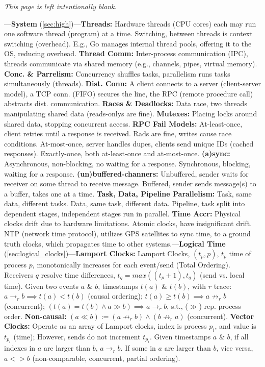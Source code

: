


\thispagestyle{empty}
\mbox{}
\vfill
\begin{center}
    \textit{This page is left intentionally blank.}
\end{center}
\vfill
\newpage
\noindent


\begin{multicols}{2}

\noindent
---\textbf{System} (\ref{sec:high})---\textbf{Threads:} Hardware threads (CPU cores) each
may run one software thread (program) at a time. Switching,
between threads is context switching (overhead). E.g.,
Go manages internal thread pools, offering it to the OS,
reducing overhead.
\textbf{Thread Comm:} Inter-process communication (IPC), 
threads communicate via shared memory (e.g., channels, pipes, virtual memory).
\textbf{Conc. \& Parrelism:} Concurrency shuffles tasks,
parallelism runs tasks simultaneously (threads).
\textbf{Dist. Conn:} A client connects to a server (client-server model), a TCP conn. (FIFO)
secures the line, the RPC (remote procedure call) abstracts
dist. communication.
\textbf{Races \& Deadlocks:} Data race, two threads manipulating shared data (reads-onlys are fine).
\textbf{Mutexes:} Placing locks around shared data, stopping concurrent access.
\textbf{RPC Fail Models:} At-least-once, client retries until a response is received.
Rads are fine, writes cause race conditions. At-most-once, server handles dupes, clients
send unique IDs (cached responses). Exactly-once, both at-least-once and at-most-once.
\textbf{(a)sync:} Asynchronous, non-blocking, no waiting for a response. Synchronous, blocking, waiting for a response.
\textbf{(un)buffered-channers:} Unbuffered, sender waits for receiver on some thread to receive message. Buffered, sender sends message(s) to a buffer, takes one at a time.
\textbf{Task, Data, Pipeline Parallelism:} Task, same data, different tasks. Data, same task, different data. Pipeline, task split into dependent stages, independent stages run in parallel.
\textbf{Time Accr:} Physical clocks drift due to hardware limitations. Atomic clocks, have insignificant drift. NTP (network time protocol), 
utilizes GPS satellites to sync time, to a ground truth clocks, which propagates time to other systems.---\textbf{Logical Time} (\ref{sec:logical_clocks})---\textbf{Lamport Clocks:} 
Lamport Clocks, $(t_p, p)$, $t_p$ time of process $p$, monotonically increases for each event/send (Total Ordering). 
Receivers $q$ resolve time differences, $t_q = max((t_p+1), t_q)$ (send vs. local time). Given 
two events $a$ \& $b$, timestamps $t(a)$ \& $t(b)$, with $r$ trace: $a\to_r b \implies t(a) < t(b)$ (causal ordering);
$t(a) \geq t(b) \implies a \not\to_r b$ (concurrent); $(t(a) = t(b) \land a\gg b) \implies a \to_r b$, s.t., ($\gg$) rep. process order.
\textbf{Non-causal:} $(a\ll b):= (a \not\to_r b) \land (b\not\to_r a)$ (concurrent).
\textbf{Vector Clocks:} Operate as an array of Lamport clocks, index is process $p_i$, and value is $t_{p_i}$ (time); However, sends do not increment $t_{p_i}$.
Given timestamps $a$ \& $b$, if all indexes in $a$ are larger than $b$, $a\to_r b$. If some in $a$ are larger than $b$, vice versa, $a<>b$ (non-comparable, concurrent, partial ordering).


\end{multicols}
